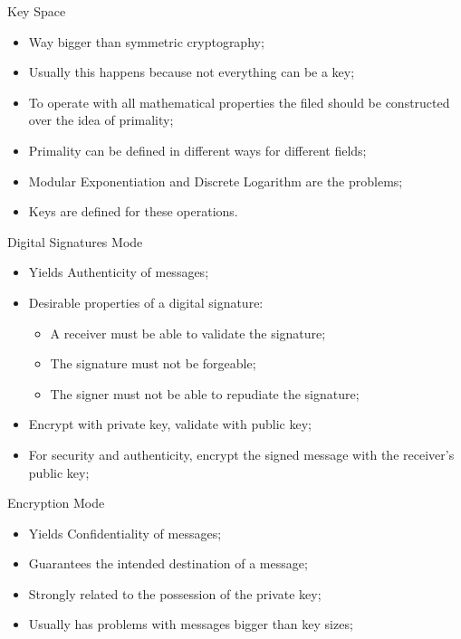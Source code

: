 \documentclass[12pt,table,xcolor={dvipsnames}]{beamer}
\begin{document}
\begin{frame}{Key Space}
\begin{itemize}
\item Way bigger than symmetric cryptography;\pause
\item Usually this happens because not everything can be a key;\pause
\item To operate with all mathematical properties the filed should be constructed over the idea of primality;\pause
\item Primality can be defined in different ways for different fields;\pause
\item Modular Exponentiation and Discrete Logarithm are the problems;\pause
\item Keys are defined for these operations.
\end{itemize}
\end{frame}

\begin{frame}{Digital Signatures Mode}
\begin{itemize}
\item Yields Authenticity of messages;\pause
\item Desirable properties of a digital signature:\pause
\begin{itemize}
\item A receiver must be able to validate the signature;\pause
\item The signature must not be forgeable; \pause
\item The signer must not be able to repudiate the signature;\pause
\end{itemize}
\item Encrypt with private key, validate with public key;\pause
\item For security and authenticity, encrypt the signed message with the receiver’s public key;
\end{itemize}
\end{frame}

\begin{frame}{Encryption Mode}
\begin{itemize}
\item Yields Confidentiality of messages;\pause
\item Guarantees the intended destination of a message;\pause
\item Strongly related to the possession of the private key;\pause
\item Usually has problems with messages bigger than key sizes;\pause
\end{itemize}
\end{frame}
\end{document}
